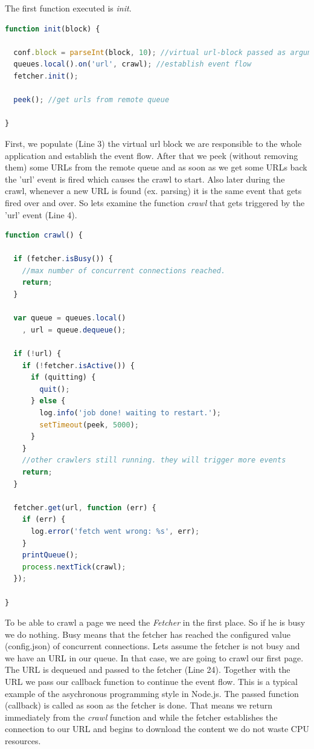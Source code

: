 The first function executed is \emph{init}.

\begin{lstlisting}[language=JavaScript]
function init(block) {

  conf.block = parseInt(block, 10); //virtual url-block passed as argument on startup
  queues.local().on('url', crawl); //establish event flow
  fetcher.init();

  peek(); //get urls from remote queue

}
\end{lstlisting}

First, we populate (Line 3) the virtual url block we are responsible to the whole application and establish the event flow. After that we peek (without removing them) some URLs from the remote queue and as soon as we get some URLs back the 'url' event is fired which causes the crawl to start. Also later during the crawl, whenever a new URL is found (ex. parsing) it is the same event that gets fired over and over. So lets examine the function \emph{crawl} that gets triggered by the 'url' event (Line 4).

\begin{lstlisting}[language=JavaScript]
function crawl() {

  if (fetcher.isBusy()) {
    //max number of concurrent connections reached.
    return;
  }

  var queue = queues.local()
    , url = queue.dequeue();

  if (!url) {
    if (!fetcher.isActive()) {
      if (quitting) {
        quit();
      } else {
        log.info('job done! waiting to restart.');
        setTimeout(peek, 5000);
      }
    }
    //other crawlers still running. they will trigger more events
    return;
  }

  fetcher.get(url, function (err) {
    if (err) {
      log.error('fetch went wrong: %s', err);
    }
    printQueue();
    process.nextTick(crawl);
  });

}
\end{lstlisting}

To be able to crawl a page we need the \emph{Fetcher} in the first place. So if he is busy we do nothing. Busy means that the fetcher has reached the configured value (config.json) of concurrent connections.
Lets assume the fetcher is not busy and we have an URL in our queue. In that case, we are going to crawl our first page. The URL is dequeued and passed to the fetcher (Line 24). Together with the URL we pass our callback function to continue the event flow. This is a typical example of the asychronous programming style in Node.js. The passed function (callback) is called as soon as the fetcher is done. That means we return immediately from the \emph{crawl} function and while the fetcher establishes the connection to our URL and begins to download the content we do not waste CPU resources. 

